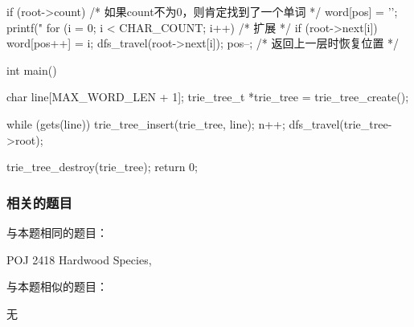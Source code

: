 \begin{Codex}[label=hardwood_species.c]
{    if (root->count) { /* 如果count不为0，则肯定找到了一个单词 */
        word[pos] = '\0';
        printf("%
    }
    for (i = 0; i < CHAR_COUNT; i++) {  /* 扩展 */
        if (root->next[i]) {
            word[pos++] = i;
            dfs_travel(root->next[i]);
            pos--; /* 返回上一层时恢复位置 */
        }
    }
}

int main() {
    char line[MAX_WORD_LEN + 1];
    trie_tree_t *trie_tree = trie_tree_create();

    while (gets(line)) {
        trie_tree_insert(trie_tree, line);
        n++;
    }
    dfs_travel(trie_tree->root);

    trie_tree_destroy(trie_tree);
    return 0;
}
\end{Codex}


\subsubsection{相关的题目}
与本题相同的题目：
\begindot
\item POJ 2418 Hardwood Species, 
\myenddot

与本题相似的题目：
\begindot
\item 无
\myenddot
